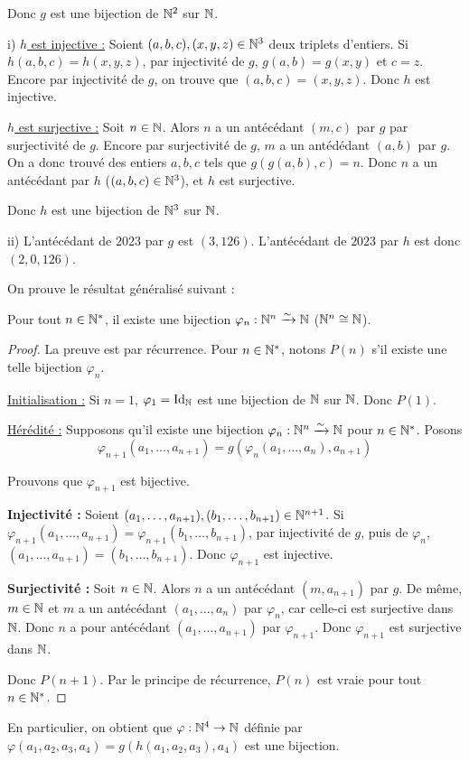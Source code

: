 \documentclass[]{../templates/homework}
\begin{document}
Donc $g$ est une bijection de $\mathbb N^{2}$ sur $\mathbb N$.

\question i)
\underline{$h$ est injective :}
Soient $(a,b,c), (x,y,z) \in \mathbb N^{3}$ deux triplets d'entiers. Si $h(a,b,c) = h(x,y,z)$, par injectivité de $g$, $g(a,b) = g(x,y)$ et $c = z$. Encore par injectivité de $g$, on trouve que $(a,b,c) = (x,y,z)$. Donc $h$ est injective.

\underline{$h$ est surjective :}
Soit $n\in\mathbb N$. Alors $n$ a un antécédant $(m,c)$ par $g$ par surjectivité de $g$. Encore par surjectivité de $g$, $m$ a un antédédant $(a,b)$ par $g$. On a donc trouvé des entiers $a,b,c$ tels que $g(g(a,b),c) = n$. Donc $n$ a un antécédant par $h$ ($(a,b,c) \in \mathbb N^3$), et $h$ est surjective.

Donc $h$ est une bijection de $\mathbb N^{3}$ sur $\mathbb N$.

ii) L'antécédant de $2023$ par $g$ est $(3, 126)$. L'antécédant de $2023$ par $h$ est donc $(2,0,126)$.

\question
On prouve le résultat généralisé suivant :
\begin{thm}
  Pour tout $n\in\mathbb N^{*}$, il existe une bijection $\varphi_{n}: \mathbb N^{n}\xrightarrow{\sim} \mathbb N$ ($\mathbb N^{n} \cong \mathbb N$).
\end{thm}
\begin{proof}
  La preuve est par récurrence. Pour $n\in\mathbb N^{*}$, notons $P(n)$ s'il existe une telle bijection $\varphi_{n}$.

  \underline{Initialisation :} Si $n=1$, $\varphi_{1} = \mathrm{Id}_{\mathbb N}$ est une bijection de $\mathbb N$ sur $\mathbb N$. Donc $P(1)$.

  \underline{Hérédité :} Supposons qu'il existe une bijection $\varphi_{n}: \mathbb N^{n}\xrightarrow{\sim} \mathbb N$ pour $n\in\mathbb N^{*}$. Posons $$\varphi_{n+1}(a_{1},\dots,a_{n+1}) = g\left(\varphi_{n}(a_{1}, \dots, a_{n}), a_{n+1}\right)$$

  Prouvons que $\varphi_{n+1}$ est bijective.

  \textbf{Injectivité :} Soient $(a_{1},\dots, a_{n+1}), (b_{1},\dots, b_{n+1})\in\mathbb N^{n+1}$. Si $\varphi_{n+1}(a_{1},\dots,a_{n+1}) = \varphi_{n+1}(b_{1},\dots,b_{n+1})$, par injectivité de $g$, puis de $\varphi_{n}$, $(a_{1},\dots, a_{n+1}) = (b_{1},\dots, b_{n+1})$. Donc $\varphi_{n+1}$ est injective.

  \textbf{Surjectivité :} Soit $n\in\mathbb N$. Alors $n$ a un antécédant $(m, a_{n+1})$ par $g$. De même, $m \in \mathbb N$ et $m$ a un antécédant $(a_{1}, \dots, a_{n})$ par $\varphi_{n}$, car celle-ci est surjective dans $\mathbb N$. Donc $n$ a pour antécédant $(a_{1}, \dots, a_{n+1})$ par $\varphi_{n+1}$. Donc $\varphi_{n+1}$ est surjective dans $\mathbb N$.

  Donc $P(n+1)$. Par le principe de récurrence, $P(n)$ est vraie pour tout $n\in \mathbb N^{*}$.
\end{proof}
En particulier, on obtient que $\varphi: \mathbb N^{4} \rightarrow \mathbb N$ définie par $\varphi(a_{1},a_{2},a_{3},a_{4}) = g(h(a_{1},a_{2},a_{3}),a_{4})$ est une bijection.
\end{document}
